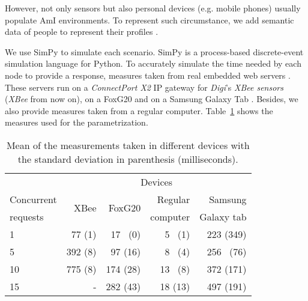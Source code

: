 However, not only sensors but also personal devices (e.g. mobile phones) usually populate AmI environments.
To represent such circumstance, we add semantic data of people to represent their profiles .

We use SimPy  to simulate each scenario.
SimPy is a process-based discrete-event simulation language for Python.
To accurately simulate the time needed by each node to provide a response, measures taken from real embedded web servers \citep{gomez-goiri_restful_2012}.
These servers run on a \textit{ConnectPort X2} IP gateway  for \textit{Digi}'s \textit{XBee sensors}  (\textit{XBee} from now on),
on a FoxG20  and on a Samsung Galaxy Tab .
Besides, we also provide measures taken from a regular computer.
Table~\ref{tab:measures_embedded} shows the measures used for the parametrization.


\begin{table}
  \begin{center}
	\begin{tabular}{p{2.5cm} r r r r}
	  \hline
	  & \multicolumn{4}{c}{Devices} \\
	  \cline{2-5}
	  Concurrent & \multirow{2}{*}{XBee} & \multirow{2}{*}{FoxG20} & Regular  & Samsung \\
	  requests   &  ~    &   ~     & computer & Galaxy tab \\
	  \hline
	  1  &  77 (1)	&  17 ~(0)  &   5 ~(1)  &  223 (349) \\
	  5  & 392 (8)	&  97 (16) &   8 ~(4)  &  256 ~(76)  \\
	  10 & 775 (8)	& 174 (28) &  13 ~(8)  &  372 (171) \\
	  15 &  -   	& 282 (43) &  18 (13) &  497 (191) \\
	  \hline
	\end{tabular}
  \end{center}
  \caption{Mean of the measurements taken in different devices with the standard deviation in parenthesis (milliseconds).}
  \label{tab:measures_embedded}
\end{table}


